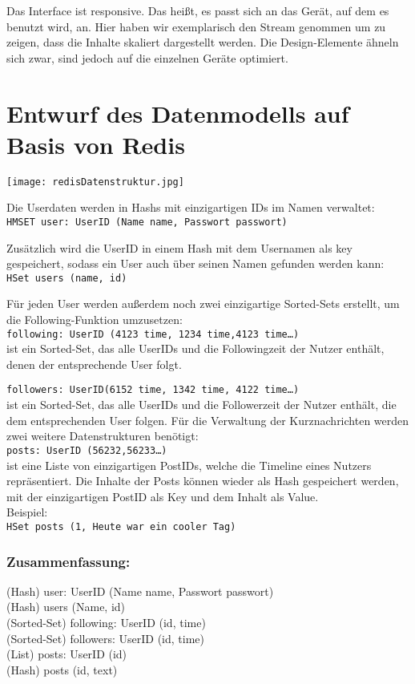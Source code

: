     Das Interface ist responsive. Das heißt, es passt sich an das Gerät, auf dem es benutzt wird, an. Hier haben wir exemplarisch den Stream genommen um zu zeigen, dass die Inhalte skaliert dargestellt werden. Die Design-Elemente ähneln sich zwar, sind jedoch auf die einzelnen Geräte optimiert.

\newpage
  \section{Entwurf des Datenmodells auf Basis von Redis}
  \begin{center}
    \texttt{[image: redisDatenstruktur.jpg]}
  \end{center}

  Die Userdaten werden in Hashs mit einzigartigen IDs im Namen verwaltet: \\
  \texttt{HMSET user: UserID (Name name, Passwort passwort)}

  Zusätzlich wird die UserID in einem Hash mit dem Usernamen als key gespeichert, sodass ein User auch über seinen Namen gefunden werden kann: \\
  \texttt{HSet users (name, id)}

  Für jeden User werden außerdem noch zwei einzigartige Sorted-Sets erstellt, um die Following-Funktion umzusetzen: \\
  \texttt{following: UserID (4123 time, 1234 time,4123 time…)} \\ ist ein Sorted-Set, das alle UserIDs und die Followingzeit der Nutzer enthält, denen der entsprechende User folgt.

  \texttt{followers: UserID(6152 time, 1342 time, 4122 time…)} \\ ist ein Sorted-Set, das alle UserIDs und die Followerzeit der Nutzer enthält, die dem entsprechenden User folgen.
  Für die Verwaltung der Kurznachrichten werden zwei weitere Datenstrukturen benötigt: \\
  \texttt{posts: UserID (56232,56233…)} \\ ist eine Liste von einzigartigen PostIDs, welche die Timeline eines Nutzers repräsentiert.
  Die Inhalte der Posts können wieder als Hash gespeichert werden, mit der einzigartigen PostID als Key und dem Inhalt als Value. \\Beispiel: \\
  \texttt{HSet posts (1, Heute war ein cooler Tag)}

\newpage
  \subsubsection{Zusammenfassung:}
  (Hash) user: UserID (Name name, Passwort passwort) \\
  (Hash) users (Name, id) \\
  (Sorted-Set) following: UserID (id, time) \\
  (Sorted-Set) followers: UserID (id, time) \\
  (List) posts: UserID (id) \\
  (Hash) posts (id, text)
